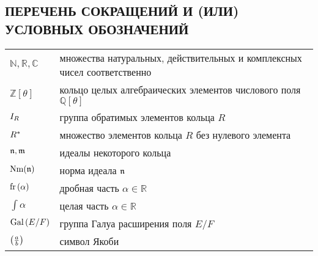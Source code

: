 \documentclass[_00_dissertation.tex]{subfiles}
\begin{document}
\onlyinsubfile{
    \renewcommand{\contentsname}{ОГЛАВЛЕНИЕ}
    \setcounter{tocdepth}{3}
    \tableofcontents
}

\newpage
\begin{center}
    \section*{ПЕРЕЧЕНЬ СОКРАЩЕНИЙ И (ИЛИ) УСЛОВНЫХ ОБОЗНАЧЕНИЙ}
\end{center}

\begin{longtable}{p{}p{}}
    $\mathbb{N}, \mathbb{R}, \mathbb{C}$ & множества натуральных, действительных и
комплексных чисел соответственно\\

    $\mathbb{Z}[\theta]$ & кольцо целых алгебраических элементов числового поля $\mathbb{Q}[\theta]$\\

    $I_{R}$ & группа обратимых элементов кольца $R$\\

    $R^{*}$ & множество элементов кольца $R$ без нулевого элемента\\

    $\mathfrak{n}, \mathfrak{m}$ & идеалы некоторого кольца\\

    $\textrm{Nm}(\mathfrak{n})$ & норма идеала $\mathfrak{n}$\\

    $\textrm{fr}\left(\alpha\right)$ & дробная часть $\alpha \in \mathbb{R}$\\

    $\int{\alpha}$ & целая часть $\alpha \in \mathbb{R}$\\

    $\textrm{Gal}\left(E/F\right)$ & группа Галуа расширения поля $E/F$\\

    $\left(\frac{a}{b}\right)$ & символ Якоби\\

\end{longtable}
\end{document}
